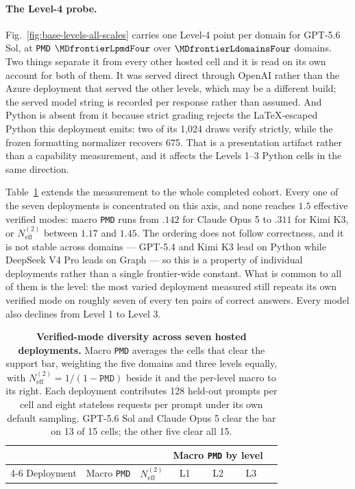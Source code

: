 \documentclass{article}
\newcommand{\1}{\mathbf 1}
\newcommand{\pmd}{\texttt{PMD}}
\newcommand{\neff}{\ensuremath{N^{(2)}_{\mathrm{eff}}}}
\theoremstyle{remark}
\theoremstyle{definition}
\theoremstyle{plain}
\begin{document}
\paragraph{The Level-4 probe.}
Fig.~\ref{fig:base-levels-all-scales} carries one Level-4 point per domain for
GPT-5.6 Sol, at \pmd{} $\MDfrontierLpmdFour$ over $\MDfrontierLdomainsFour$
domains. Two things separate it from every other hosted cell and it is read
on its own account for both of them. It was
served direct through OpenAI rather than the Azure deployment that served the
other levels, which may be a different build; the served model string is
recorded per response rather than assumed. And Python is absent from it because
strict grading rejects the LaTeX-escaped Python this deployment emits: two of
its 1,024 draws verify strictly, while the frozen formatting normalizer
recovers 675. That is a presentation artifact rather than a capability
measurement, and it affects the Levels 1--3 Python cells in the same direction.

Table~\ref{tab:hosted-cohort-mode-diversity} extends the measurement to the
whole completed cohort. Every one of the seven deployments is concentrated on
this axis, and none reaches $1.5$ effective verified modes: macro \pmd{} runs
from $.142$ for Claude Opus 5 to $.311$ for Kimi K3, or $\neff$ between $1.17$
and $1.45$. The ordering does not follow correctness, and it is not stable
across domains --- GPT-5.4 and Kimi K3 lead on Python while DeepSeek V4 Pro
leads on Graph --- so this is a property of individual deployments rather than
a single frontier-wide constant. What is common to all of them is the level:
the most varied deployment measured still repeats its own verified mode on
roughly seven of every ten pairs of correct answers. Every model also declines
from Level 1 to Level 3.

\begin{table}[!htbp]
  \centering
  \caption{\textbf{Verified-mode diversity across seven hosted deployments.}
  Macro \pmd{} averages the cells that clear the support bar, weighting the
  five domains and three levels equally, with $\neff=1/(1-\pmd{})$ beside it
  and the per-level macro to its right. Each deployment contributes 128
  held-out prompts per cell and eight stateless requests per prompt under its
  own default sampling. GPT-5.6 Sol and Claude Opus 5 clear the bar on 13 of
  15 cells; the other five clear all 15.}
  \label{tab:hosted-cohort-mode-diversity}
  \small
  \begin{tabular}{lcccccc}
    \toprule
    & & & \multicolumn{3}{c}{Macro \pmd{} by level} \\
    \cmidrule(lr){4-6}
    Deployment & Macro \pmd{} & $\neff$ & L1 & L2 & L3 \\
    \midrule
    
  \end{tabular}
\end{table}
\end{document}
